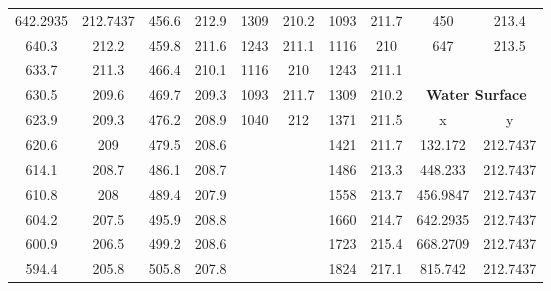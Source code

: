 \begin{center}
\begin{tabular}{|cccc||cccc||cc|}
    642.2935 & 212.7437                 & 456.6 & 212.9                         & 1309     & 210.2                   & 1093  & 211.7                         & 450      & 213.4                               \\
    640.3    & 212.2                    & 459.8 & 211.6                         & 1243     & 211.1                   & 1116  & 210                           & 647      & 213.5                               \\
    633.7    & 211.3                    & 466.4 & 210.1                         & 1116     & 210                     & 1243  & 211.1                         &          &                                     \\
    630.5    & 209.6                    & 469.7 & 209.3                         & 1093     & 211.7                   & 1309  & 210.2                         & \multicolumn{2}{c|}{\textbf{Water Surface }}   \\ 
    \cline{9-10}
    623.9    & 209.3                    & 476.2 & 208.9                         & 1040     & 212                     & 1371  & 211.5                         & x        & y                                   \\
    620.6    & 209                      & 479.5 & 208.6                         &          &                         & 1421  & 211.7                         & 132.172  & 212.7437                            \\
    614.1    & 208.7                    & 486.1 & 208.7                         &          &                         & 1486  & 213.3                         & 448.233  & 212.7437                            \\
    610.8    & 208                      & 489.4 & 207.9                         &          &                         & 1558  & 213.7                         & 456.9847 & 212.7437                            \\
    604.2    & 207.5                    & 495.9 & 208.8                         &          &                         & 1660  & 214.7                         & 642.2935 & 212.7437                            \\
    600.9    & 206.5                    & 499.2 & 208.6                         &          &                         & 1723  & 215.4                         & 668.2709 & 212.7437                            \\
    594.4    & 205.8                    & 505.8 & 207.8                         &          &                         & 1824  & 217.1                         & 815.742  & 212.7437                            \\

\end{tabular}
\end{center}
